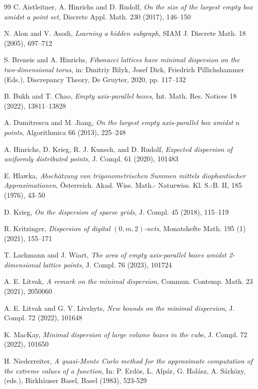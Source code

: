 \documentclass[11pt]{article}
\begin{document}
\begin{thebibliography}{99}
 C. Aistleitner, A. Hinrichs and D. Rudolf, \emph{On the size of the largest empty box amidst a point set}, Discrete Appl. Math. 230 (2017), 146--150

 N. Alon and V. Asodi, \emph{Learning a hidden subgraph}, SIAM J. Discrete Math. 18 (2005), 697--712

 S. Breneis and A. Hinrichs, \emph{Fibonacci lattices have minimal dispersion on the two-dimensional torus}, in: Dmitriy Bilyk, Josef
Dick, Friedrich Pillichshammer (Eds.), Discrepancy Theory, De Gruyter, 2020, pp. 117–132

 B. Bukh and T. Chao, \emph{Empty axis-parallel boxes}, Int. Math. Res. Notices 18 (2022), 13811--13828

 A. Dumitrescu and M. Jiang, \emph{On the largest empty axis-parallel box amidst $n$ points}, Algorithmica 66 (2013), 225--248

 A. Hinrichs, D. Krieg, R. J. Kunsch, and D. Rudolf, \emph{Expected dispersion of uniformly distributed points},
J. Compl. 61 (2020), 101483

 E. Hlawka, \emph{Absch\"atzung von trigonometrischen Summen mittels diophantischer Approximationen}, \"Osterreich. Akad. Wiss. Math.-
Naturwiss. Kl. S.-B. II, 185 (1976), 43--50

 D. Krieg, \emph{On the dispersion of sparse grids}, J. Compl. 45 (2018), 115--119

 R. Kritzinger, \emph{Dispersion of digital $(0, m, 2)$-nets}, Monatshefte Math.  195 (1) (2021), 155--171

 T. Lachmann and J. Wiart, \emph{The area of empty axis-parallel boxes amidst 2-dimensional lattice points}, J. Compl. 76 (2023), 101724

 A. E. Litvak, \emph{A remark on the minimal dispersion}, Commun. Contemp. Math. 23 (2021), 2050060

 A. E. Litvak and G. V. Livshyts, \emph{New bounds on the minimal dispersion}, J. Compl. 72 (2022), 101648

 K. MacKay, \emph{Minimal dispersion of large volume boxes in the cube}, J. Compl. 72 (2022), 101650

  H. Niederreiter, \emph{A quasi-Monte Carlo method for the approximate computation of the extreme values of a function},
In: P. Erd\"os, L. Alp\'ar, G. Hal\'asz, A. S\'ark\"ozy, (eds.), Birkh\"auser Basel, Basel (1983), 523-529


\end{thebibliography}
\end{document}
